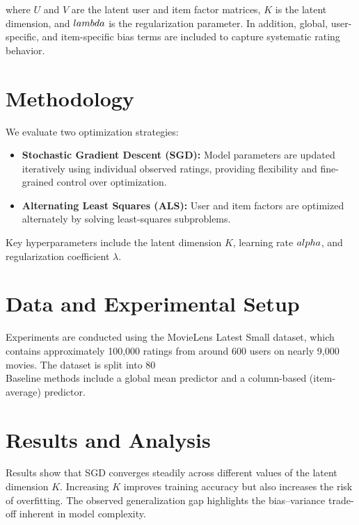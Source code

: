 \documentclass[11pt]{article}
\begin{document}
where $U$ and $V$ are the latent user and item factor matrices, $K$ is the latent dimension, and $\\lambda$ is the regularization parameter. In addition, global, user-specific, and item-specific bias terms are included to capture systematic rating behavior.

\section{Methodology}
We evaluate two optimization strategies:

\begin{itemize}
  \item \textbf{Stochastic Gradient Descent (SGD):} Model parameters are updated iteratively using individual observed ratings, providing flexibility and fine-grained control over optimization.
  \item \textbf{Alternating Least Squares (ALS):} User and item factors are optimized alternately by solving least-squares subproblems.
\end{itemize}

Key hyperparameters include the latent dimension $K$, learning rate $\\alpha$, and regularization coefficient $\lambda$.

\section{Data and Experimental Setup}
Experiments are conducted using the MovieLens Latest Small dataset, which contains approximately 100,000 ratings from around 600 users on nearly 9,000 movies. The dataset is split into 80\\%

Baseline methods include a global mean predictor and a column-based (item-average) predictor.

\section{Results and Analysis}
Results show that SGD converges steadily across different values of the latent dimension $K$. Increasing $K$ improves training accuracy but also increases the risk of overfitting. The observed generalization gap highlights the bias--variance trade-off inherent in model complexity.
\end{document}
